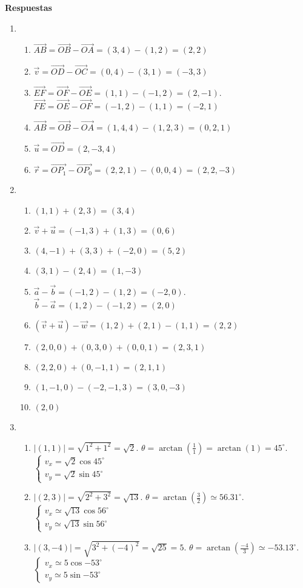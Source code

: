 \documentclass[a4paper]{article}
\newcommand{\exercise}{\item}
\newcommand{\SEL}[1]{ \left\{\begin{matrix} #1 \end{matrix}\right. }
\newcommand{\df}[2]{\displaystyle\frac{#1}{#2}}
\newcommand{\vect}[1]{\overrightarrow{#1}}
\newcommand{\degs}{^{\circ}}
\begin{document}
 \textbf{Respuestas}\begin{enumerate}\exercise\begin{enumerate} [label=(\alph*)]		\item $\vect{AB}= \vect{OB} - \vect{OA} = (3,4) - (1,2) = (2,2)$
		\item $\vec{v}= \vect{OD} - \vect{OC} = (0,4) - (3,1)= (-3,3)$
		\item $\vect{EF} = \vect{OF} - \vect{OE} = (1,1) - (-1,2) = (2,-1)$. $\vect{FE} = \vect{OE} - \vect{OF} = (-1,2) - (1,1) = (-2,1)$
		\item $\vect{AB} = \vect{OB} - \vect{OA} = (1,4,4) - (1,2,3) = (0,2,1)$
		\item $\vec{u} = \vect{OD} = (2,-3,4)$
		\item $\vec{r} = \vect{OP_1} - \vect{OP_0} = (2,2,1) - (0,0,4) = (2,2,-3)$
\end{enumerate}\exercise\begin{enumerate} [label=(\alph*)]		\item $(1,1)+(2,3) = (3,4)$
		\item $\vec{v} + \vec{u} = (-1,3) + (1,3) = (0,6)$
		\item $(4,-1)+(3,3)+(-2,0) = (5,2)$
		\item $(3,1)-(2,4) = (1,-3)$
		\item $\vec{a} - \vec{b} = (-1,2) - (1,2) = (-2,0)$. $\vec{b} - \vec{a} = (1,2) - (-1,2) = (2,0)$
		\item $\left(\vec{v}+\vec{u}\right)-\vec{w} = (1,2)+(2,1)-(1,1) = (2,2)$
		\item $(2,0,0)+(0,3,0)+(0,0,1) = (2,3,1)$
		\item $(2,2,0)+(0,-1,1) = (2,1,1)$
		\item $(1,-1,0)-(-2,-1,3) = (3,0,-3)$
		\item $(2,0)$
\end{enumerate}\exercise\begin{enumerate} [label=(\alph*)]		\item $|(1,1)| = \sqrt{1^2+1^2} = \sqrt{2}$. $\theta=\arctan\left(\df{1}{1}\right) = \arctan(1) = 45\degs$. $\SEL{v_x=\sqrt{2} \cos{45\degs} \\ v_y=\sqrt{2} \sin{45\degs} }$
		\item $|(2,3)| = \sqrt{2^2+3^2} = \sqrt{13}$. $\theta=\arctan\left(\df{3}{2}\right) \simeq 56.31\degs$.  $\SEL{v_x \simeq\sqrt{13} \cos{56\degs} \\ v_y\simeq\sqrt{13} \sin{56\degs} }$
		\item $|(3,-4)| = \sqrt{3^2+(-4)^2} = \sqrt{25} = 5$. $\theta=\arctan\left(\df{-4}{3}\right) \simeq -53.13\degs$. $\SEL{v_x \simeq 5 \cos{-53\degs} \\ v_y\simeq5 \sin{-53\degs} }$

\end{enumerate}
\end{enumerate}
\end{document}
